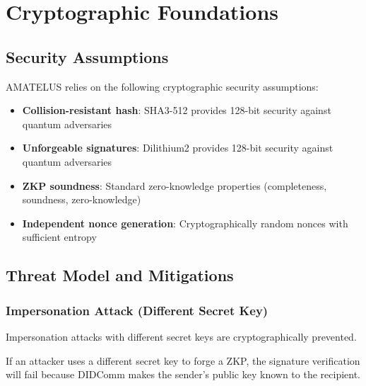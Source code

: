 \chapter{Cryptographic Foundations}

\section{Security Assumptions}

\begin{definition}
  \label{def:crypto-assumptions}
  AMATELUS relies on the following cryptographic security assumptions:
  \begin{itemize}
    \item \textbf{Collision-resistant hash}: SHA3-512 provides 128-bit security against quantum adversaries
    \item \textbf{Unforgeable signatures}: Dilithium2 provides 128-bit security against quantum adversaries
    \item \textbf{ZKP soundness}: Standard zero-knowledge properties (completeness, soundness, zero-knowledge)
    \item \textbf{Independent nonce generation}: Cryptographically random nonces with sufficient entropy
  \end{itemize}
  \leanok
\end{definition}

\section{Threat Model and Mitigations}

\subsection{Impersonation Attack (Different Secret Key)}

\begin{theorem}
  \label{thm:impersonation-resistance}
  Impersonation attacks with different secret keys are cryptographically prevented.

  If an attacker uses a different secret key to forge a ZKP, the signature verification will fail
  because DIDComm makes the sender's public key known to the recipient.
  \leanok
\end{theorem}

